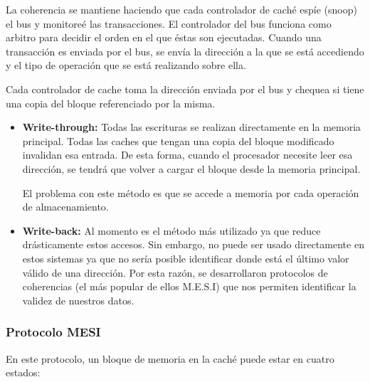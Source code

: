 La coherencia se mantiene haciendo que cada controlador de caché espíe (snoop) el bus y monitoreé las transacciones. El controlador del bus funciona como arbitro para  decidir el orden en el que éstas son ejecutadas. Cuando una transacción es enviada por el bus, se envía la dirección a la que se está accediendo y el tipo de operación que se está realizando sobre ella.

Cada controlador de cache toma la dirección enviada por el bus y chequea si tiene una copia del bloque referenciado por la misma.

\begin{itemize}
	\item \textbf{Write-through:} Todas las escrituras se realizan directamente en la memoria principal. Todas las caches que tengan una copia del bloque modificado invalidan esa entrada. De esta forma, cuando el procesador necesite leer esa dirección, se tendrá que volver a cargar el bloque desde la memoria principal.
	
	El problema con este método es que se accede a memoria por cada operación de almacenamiento.
	
	\item  \textbf{Write-back:} Al momento es el método más utilizado ya que reduce drásticamente estos accesos. Sin embargo, no puede ser usado directamente en estos sistemas ya que no sería posible identificar donde está el último valor válido de una dirección. Por esta razón, se desarrollaron protocolos de coherencias (el más popular de ellos M.E.S.I) que nos permiten identificar la validez de nuestros datos.
\end{itemize}

\subsubsection{Protocolo MESI}
En este protocolo, un bloque de memoria en la caché puede estar en cuatro estados:

